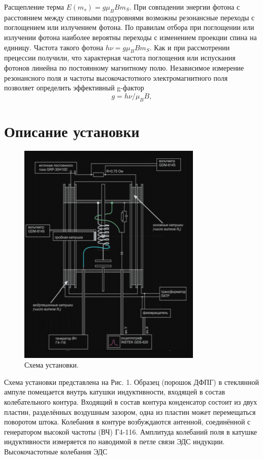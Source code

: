 \documentclass[%
reprint,
amsmath,amssymb,
aps,
]{revtex4-2}
\begin{document}
Расщепление терма $E(m_s) = g \mu_B B m_S$. При совпадении энергии фотона с расстоянием
между спиновыми подуровнями возможны резонансные переходы с поглощением или
излучением фотона. По правилам отбора при
поглощении или излучении фотона наиболее
вероятны переходы с изменением проекции спина на единицу. Частота такого фотона
$h \nu = g \mu_B B m_S$. Как и при рассмотрении прецессии получили, что характерная частота
поглощения или испускания фотонов линейна по постоянному магнитному полю.
Независимое измерение резонансного поля и частоты высокочастотного электромагнитного
поля позволяет определить эффективный g-фактор
\begin{equation}\label{2}
g = h \nu / \mu_B B,
\end{equation}
\section{Описание установки}
\begin{figure}
\includegraphics{1.png}
\centering
\caption{Схема установки.}
\end{figure}
Схема установки представлена на Рис. 1. Образец (порошок ДФПГ) в стеклянной ампуле помещается внутрь катушки индуктивности, входящей в состав колебательного контура. Входящий в состав контура конденсатор состоит из двух пластин, разделённых воздушным зазором, одна из пластин может перемещаться поворотом штока. Колебания в контуре возбуждаются антенной, соединённой с генератором высокой частоты (ВЧ) Г4-116. Амплитуда колебаний поля в катушке индуктивности
измеряется по наводимой в петле связи ЭДС индукции. Высокочастотные колебания ЭДС
\end{document}

